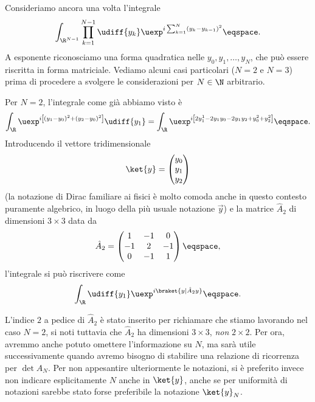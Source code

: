 Consideriamo ancora una volta l'integrale 
\begin{equation}\label{eq:gN}
\int_{\R^{N-1}} \prod_{k=1}^{N-1} \udiff{y_{k}} \uexp^{i \sum_{k=1}^{N}  \left(
y_{k} - y_{k-1} \right)^{2}} \eqspace .
\end{equation}
A esponente riconosciamo una forma quadratica nelle $y_{0}, y_{1}, \ldots,
y_{N}$, che pu\`o essere riscritta in forma matriciale.
Vediamo alcuni casi particolari ($N=2$ e $N=3$) prima di procedere a svolgere le
considerazioni per $N\in\N$ arbitrario.
\par
Per $N=2$, l'integrale come gi\`a abbiamo visto \`e
\begin{displaymath}
\int_{\R} \uexp^{ i  \left[ \left( y_{1} - y_{0} \right)^{2} + \left( y_{2} -
y_{0} \right)^{2} \right] } \udiff{y_{1}}  
= \int_{\R} \uexp^{i \left[  2  y_{1}^{1}  -2 y_{1} y_{0} - 2 y_{1} y_{2} + y_{0}^{2}
+ y_{2} ^{2}\right]} \eqspace .
\end{displaymath}
Introducendo il vettore tridimensionale
\begin{displaymath}
\ket{y} = \begin{pmatrix} 
y_{0} \\ y_{1} \\ y_{2} 
\end{pmatrix}
\end{displaymath}
(la notazione di Dirac familiare ai fisici \`e molto comoda anche in questo contesto puramente algebrico, 
in luogo della pi\`u usuale notazione $\vec{y}$)
e la matrice $\hat{A}_{2}$ di dimensioni  $3\times3$  data da
\begin{displaymath}
\hat{A}_{2}  =  \begin{pmatrix} 1 & -1 & 0 \\ -1 & 2 & -1 \\ 0 & -1 & 1
\end{pmatrix}
\eqspace ,
\end{displaymath}
l'integrale si pu\`o riscrivere come
\begin{displaymath}
\int_{\R} \udiff{y_{1}} \uexp^{ i \braket{y| \hat{A}_{2} y} } \eqspace .
\end{displaymath}
\begin{remark}
L'indice $2$  a pedice di $\hat{A}_{2}$ \`e stato inserito per richiamare  che stiamo
lavorando nel caso $N=2$, si noti tuttavia che $\hat{A}_{2}$ ha dimensioni $3\times 3$, \emph{non}
$2\times2$.
Per ora, avremmo anche potuto omettere l'informazione su $N$, ma sar\`a utile
successivamente quando avremo bisogno di  stabilire una relazione di ricorrenza
per  $\det
\hat{A}_{N}$.
Per non appesantire ulteriormente le notazioni, si \`e preferito invece non
indicare esplicitamente $N$ anche in $\ket{y}$, anche se per uniformit\`a di
notazioni sarebbe stato forse preferibile la notazione $\ket{y}_{N}$.
\end{remark}
